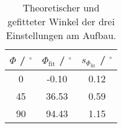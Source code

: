 \begin{table}[H]
\caption{Theoretischer und gefitteter Winkel der drei Einstellungen am Aufbau.}
\begin{center}
\begin{tabular}{|c|c|c|}
  \hline
  $\Phi$ / ${}^{\circ}$ & $\Phi_\text{fit}$ / ${}^{\circ}$ & $s_{\Phi_\text{fit}}$ / ${}^{\circ}$ \\ \hline
  0 & -0.10 & 0.12 \\ \hline
  45 & 36.53 & 0.59 \\ \hline
  90 & 94.43 & 1.15 \\ \hline
\end{tabular}
\end{center}
\label{tab:avgphis}
\end{table}
